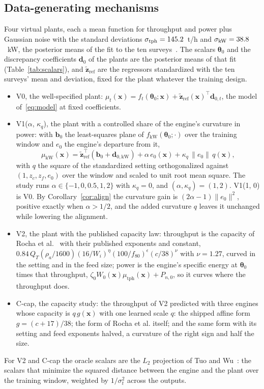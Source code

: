 \subsection{Data-generating mechanisms}

Four virtual plants, each a mean function for throughput and power plus Gaussian noise with the standard deviations
$\sigma_{\mathrm{tph}}=145.2$~t/h and $\sigma_{\mathrm{kW}}=38.8$~kW, the posterior means of the fit to the ten
surveys~\cite{cb002}. The scalars $\boldsymbol\theta_0$ and the discrepancy coefficients $\mathbf d_0$ of the plants are the
posterior means of that fit (Table~\ref{tab:scalars}), and $\tilde{\mathbf z}_{\mathrm{ref}}$ are the regressors standardized
with the ten surveys' mean and deviation, fixed for the plant whatever the training design.
\begin{itemize}
\item V0, the well-specified plant: $\mu_t(\mathbf x)=f_t(\boldsymbol\theta_0;\mathbf x)+\tilde{\mathbf z}_{\mathrm{ref}}(\mathbf
x)^{\top}\mathbf d_{0,t}$, the model of~\eqref{eq:model} at fixed coefficients.
\item V1($\alpha$, $\kappa_q$), the plant with a controlled share of the engine's curvature in power: with $\mathbf b_0$ the
least-squares plane of $f_{\mathrm{kW}}(\boldsymbol\theta_0;\cdot)$ over the training window and $e_0$ the engine's departure
from it,
\begin{equation}
\mu_{\mathrm{kW}}(\mathbf x)=\tilde{\mathbf z}_{\mathrm{ref}}^{\top}(\mathbf b_0+\mathbf d_{0,\mathrm{kW}})+\alpha\,e_0(\mathbf x)+\kappa_q\,\|e_0\|\,q(\mathbf x),
\label{eq:v1}
\end{equation}
with $q$ the square of the standardized setting orthogonalized against $(1,z_c,z_f,e_0)$ over the window and scaled to unit
root mean square. The study runs $\alpha\in\{-1,0,0.5,1,2\}$ with $\kappa_q=0$, and $(\alpha,\kappa_q)=(1,2)$. V1(1, 0) is V0.
By Corollary~\ref{cor:align} the curvature gain is $(2\alpha-1)\|e_0\|^2$, positive exactly when $\alpha>1/2$, and the added
curvature $q$ leaves it unchanged while lowering the alignment.
\item V2, the plant with the published capacity law: throughput is the capacity of Rocha et al.~\cite{rocha} with their
published exponents and constant, $0.84\,Q_T(\rho_a/1600)(16/W_i)^{\eta}(100/f_{80})^{\epsilon}(c/38)^{\nu}$ with
$\nu=1.27$, curved in the setting and in the feed size; power is the engine's specific energy at $\boldsymbol\theta_0$ times
that throughput, $\zeta_0W_0(\mathbf x)\mu_{\mathrm{tph}}(\mathbf x)+P_{n,0}$, so it curves where the throughput does.
\item C-cap, the capacity study: the throughput of V2 predicted with three engines whose capacity is $q\,g(\mathbf x)$ with one
learned scale $q$: the shipped affine form $g=(c+17)/38$; the form of Rocha et al. itself; and the same form with its setting
and feed exponents halved, a curvature of the right sign and half the size.
\end{itemize}
For V2 and C-cap the oracle scalars are the $L_2$ projection of Tuo and Wu~\cite{tuowu}: the scalars that minimize the squared
distance between the engine and the plant over the training window, weighted by $1/\sigma_t^2$ across the outputs.

